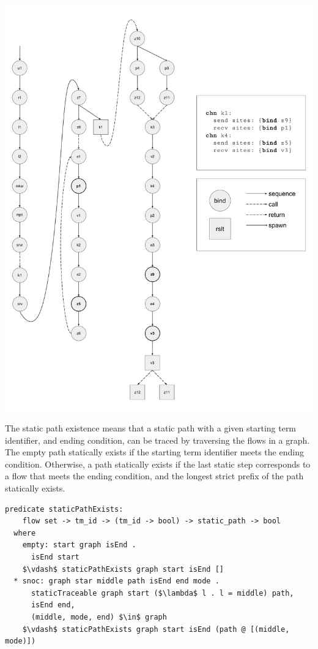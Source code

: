 \documentclass[letterpaper, 11pt]{report}
\begin{document}
\includegraphics[width=.9\textwidth]{cml-graph.pdf}

The static path existence means that a static path with a given starting term identifier, and ending
condition, can be traced by traversing the flows in a graph.
The empty path statically exists if the starting term identifier meets the ending condition.
Otherwise, a path statically exists if the last static step corresponds to a flow
that meets the ending condition, and the longest strict prefix of the path statically
exists. 

\begin{lstlisting}[language=logic, mathescape]
  predicate staticPathExists:
    flow set -> tm_id -> (tm_id -> bool) -> static_path -> bool
  where
    empty: start graph isEnd .
      isEnd start
    $\vdash$ staticPathExists graph start isEnd []
  * snoc: graph star middle path isEnd end mode .
      staticTraceable graph start ($\lambda$ l . l = middle) path, 
      isEnd end, 
      (middle, mode, end) $\in$ graph 
    $\vdash$ staticPathExists graph start isEnd (path @ [(middle, mode)])
\end{lstlisting}
\end{document}
